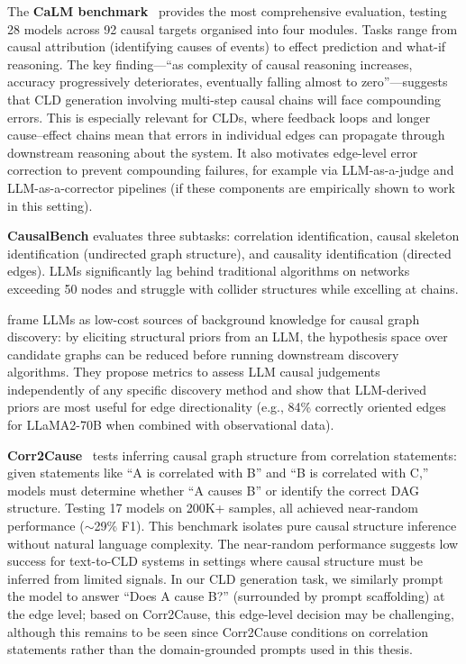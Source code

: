 The \textbf{CaLM benchmark}~\citep{chen2024calm} provides the most comprehensive evaluation, testing 28 models across 92 causal targets organised into four modules. Tasks range from causal attribution (identifying causes of events) to effect prediction and what-if reasoning. The key finding---``as complexity of causal reasoning increases, accuracy progressively deteriorates, eventually falling almost to zero''---suggests that CLD generation involving multi-step causal chains will face compounding errors. This is especially relevant for CLDs, where feedback loops and longer cause--effect chains mean that errors in individual edges can propagate through downstream reasoning about the system. It also motivates edge-level error correction to prevent compounding failures, for example via LLM-as-a-judge and LLM-as-a-corrector pipelines (if these components are empirically shown to work in this setting).

\textbf{CausalBench} evaluates three subtasks: correlation identification, causal skeleton identification (undirected graph structure), and causality identification (directed edges). LLMs significantly lag behind traditional algorithms on networks exceeding 50 nodes and struggle with collider structures while excelling at chains.

\citet{darvariu2024largelanguagemodelseffective} frame LLMs as low-cost sources of background knowledge for causal graph discovery: by eliciting structural priors from an LLM, the hypothesis space over candidate graphs can be reduced before running downstream discovery algorithms. They propose metrics to assess LLM causal judgements independently of any specific discovery method and show that LLM-derived priors are most useful for edge directionality (e.g., 84\% correctly oriented edges for LLaMA2-70B when combined with observational data).

\textbf{Corr2Cause}~\citep{jin2024largelanguagemodelsinfer} tests inferring causal graph structure from correlation statements: given statements like ``A is correlated with B'' and ``B is correlated with C,'' models must determine whether ``A causes B'' or identify the correct DAG structure. Testing 17 models on 200K+ samples, all achieved near-random performance ($\sim$29\% F1). This benchmark isolates pure causal structure inference without natural language complexity. The near-random performance suggests low success for text-to-CLD systems in settings where causal structure must be inferred from limited signals. In our CLD generation task, we similarly prompt the model to answer ``Does A cause B?'' (surrounded by prompt scaffolding) at the edge level; based on Corr2Cause, this edge-level decision may be challenging, although this remains to be seen since Corr2Cause conditions on correlation statements rather than the domain-grounded prompts used in this thesis.

